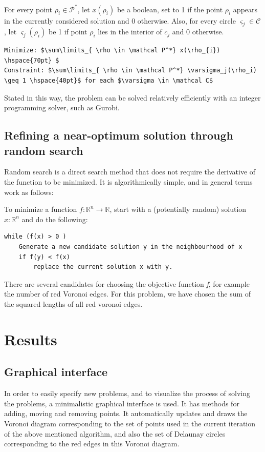 \documentclass[a4paper,12pt]{article}
\begin{document}
For every point $\rho_i \in \mathcal P^*$, let $x(\rho_i)$ be a boolean, set to 1 if the point $\rho_i$ appears in the currently considered solution and 0 otherwise. Also, for every circle $\varsigma_j \in \mathcal C$, let $\varsigma_j (\rho_i)$ be 1 if point $\rho_i$ lies in the interior of $c_j$ and 0 otherwise.

\begin{lstlisting}[mathescape]
Minimize: $\sum\limits_{ \rho \in \mathcal P^*} x(\rho_{i}) \hspace{70pt} $
Constraint: $\sum\limits_{ \rho \in \mathcal P^*} \varsigma_j(\rho_i) \geq 1 \hspace{40pt}$ for each $\varsigma \in \mathcal C$
\end{lstlisting}

Stated in this way, the problem can be solved relatively efficiently with an integer programming solver, such as Gurobi.

\subsection{Refining a near-optimum solution through random search}
\label{sec:rand}
Random search is a direct search method that does not require the derivative of the function to be minimized. It is algorithmically simple, and in general terms work as follows:

To minimize a function $f : \mathds{R}^n \rightarrow \mathds{R}$, start with a (potentially random)  solution $x :  \mathds{R}^n$ and do the following:

\begin{lstlisting}[mathescape]
while (f(x) > 0 )
	Generate a new candidate solution y in the neighbourhood of x
	if f(y) < f(x)
		replace the current solution x with y.
\end{lstlisting}

There are several candidates for choosing the objective function \emph{f}, for example the number of red Voronoi edges. For this problem, we have chosen the sum of the squared lengths of all red voronoi edges.

\section{Results}

\subsection{Graphical interface}
In order to easily specify new problems, and to visualize the process of solving the problems, a minimalistic graphical interface is used. It has methods for adding, moving and removing points. It automatically updates and draws the Voronoi diagram corresponding to the set of points used in the current iteration of the above mentioned algorithm, and also the set of Delaunay circles corresponding to the red edges in this Voronoi diagram.
\end{document}
